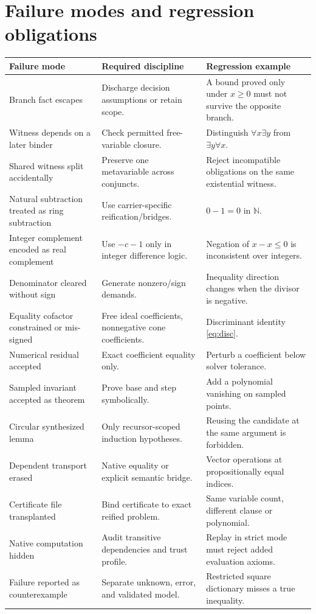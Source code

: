 \documentclass[11pt,letterpaper]{article}
\newcommand{\N}{\mathbb{N}}
\theoremstyle{definition}\newtheorem{definition}[proposition]{Definition}
\begin{document}
\section{Failure modes and regression obligations}
\label{sec:failures}
\begin{longtable}{@{}P{0.25\textwidth}P{0.41\textwidth}P{0.28\textwidth}@{}}
\toprule
Failure mode & Required discipline & Regression example \\
\midrule\endhead
Branch fact escapes & Discharge decision assumptions or retain scope. & A bound proved only under $x\ge0$ must not survive the opposite branch. \\
Witness depends on a later binder & Check permitted free-variable closure. & Distinguish $\forall x\exists y$ from $\exists y\forall x$. \\
Shared witness split accidentally & Preserve one metavariable across conjuncts. & Reject incompatible obligations on the same existential witness. \\
Natural subtraction treated as ring subtraction & Use carrier-specific reification/bridges. & $0-1=0$ in $\N$. \\
Integer complement encoded as real complement & Use $-c-1$ only in integer difference logic. & Negation of $x-x\le0$ is inconsistent over integers. \\
Denominator cleared without sign & Generate nonzero/sign demands. & Inequality direction changes when the divisor is negative. \\
Equality cofactor constrained or mis-signed & Free ideal coefficients, nonnegative cone coefficients. & Discriminant identity \eqref{eq:disc}. \\
Numerical residual accepted & Exact coefficient equality only. & Perturb a coefficient below solver tolerance. \\
Sampled invariant accepted as theorem & Prove base and step symbolically. & Add a polynomial vanishing on sampled points. \\
Circular synthesized lemma & Only recursor-scoped induction hypotheses. & Reusing the candidate at the same argument is forbidden. \\
Dependent transport erased & Native equality or explicit semantic bridge. & Vector operations at propositionally equal indices. \\
Certificate file transplanted & Bind certificate to exact reified problem. & Same variable count, different clause or polynomial. \\
Native computation hidden & Audit transitive dependencies and trust profile. & Replay in strict mode must reject added evaluation axioms. \\
Failure reported as counterexample & Separate unknown, error, and validated model. & Restricted square dictionary misses a true inequality. \\
\bottomrule
\end{longtable}
\end{document}

